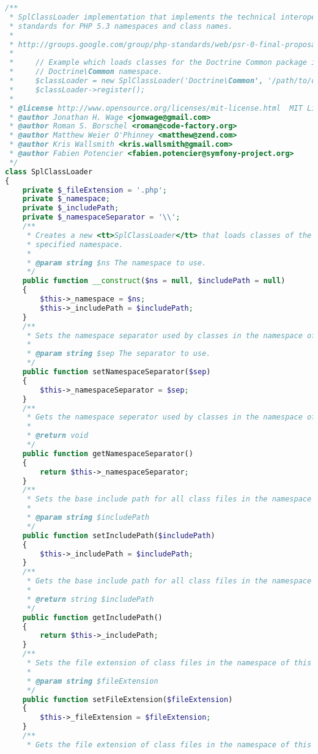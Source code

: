 \begin{lstlisting}[language=PHP]
/**
 * SplClassLoader implementation that implements the technical interoperability
 * standards for PHP 5.3 namespaces and class names.
 *
 * http://groups.google.com/group/php-standards/web/psr-0-final-proposal?pli=1
 *
 *     // Example which loads classes for the Doctrine Common package in the
 *     // Doctrine\Common namespace.
 *     $classLoader = new SplClassLoader('Doctrine\Common', '/path/to/doctrine');
 *     $classLoader->register();
 *
 * @license http://www.opensource.org/licenses/mit-license.html  MIT License
 * @author Jonathan H. Wage <jonwage@gmail.com>
 * @author Roman S. Borschel <roman@code-factory.org>
 * @author Matthew Weier O'Phinney <matthew@zend.com>
 * @author Kris Wallsmith <kris.wallsmith@gmail.com>
 * @author Fabien Potencier <fabien.potencier@symfony-project.org>
 */
class SplClassLoader
{
    private $_fileExtension = '.php';
    private $_namespace;
    private $_includePath;
    private $_namespaceSeparator = '\\';
    /**
     * Creates a new <tt>SplClassLoader</tt> that loads classes of the
     * specified namespace.
     * 
     * @param string $ns The namespace to use.
     */
    public function __construct($ns = null, $includePath = null)
    {
        $this->_namespace = $ns;
        $this->_includePath = $includePath;
    }
    /**
     * Sets the namespace separator used by classes in the namespace of this class loader.
     * 
     * @param string $sep The separator to use.
     */
    public function setNamespaceSeparator($sep)
    {
        $this->_namespaceSeparator = $sep;
    }
    /**
     * Gets the namespace seperator used by classes in the namespace of this class loader.
     *
     * @return void
     */
    public function getNamespaceSeparator()
    {
        return $this->_namespaceSeparator;
    }
    /**
     * Sets the base include path for all class files in the namespace of this class loader.
     * 
     * @param string $includePath
     */
    public function setIncludePath($includePath)
    {
        $this->_includePath = $includePath;
    }
    /**
     * Gets the base include path for all class files in the namespace of this class loader.
     *
     * @return string $includePath
     */
    public function getIncludePath()
    {
        return $this->_includePath;
    }
    /**
     * Sets the file extension of class files in the namespace of this class loader.
     * 
     * @param string $fileExtension
     */
    public function setFileExtension($fileExtension)
    {
        $this->_fileExtension = $fileExtension;
    }
    /**
     * Gets the file extension of class files in the namespace of this class loader.

\end{lstlisting}
